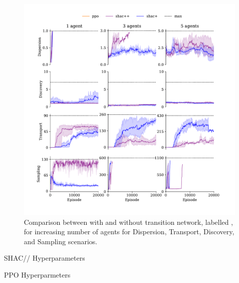 \begin{figure}[!t]
    \centering
    \includegraphics[width=\columnwidth]{figs/ablation-mlp.pdf}
    \caption{Comparison between \fname{} with and without transition network, labelled \fnamer{}, for increasing number of agents for Dispersion, Transport, Discovery, and Sampling scenarios.}
    \label{fig:ablation}
\end{figure}

\begin{table}[t]
        \centering
        
        \caption{SHAC/\fname{}/\fnamer{} Hyperparameters}
        \label{apx:tab:shac}
\end{table}

\begin{table}[t]
        \centering
        
        \caption{PPO Hyperparmeters}
        \label{apx:tab:ppo}
\end{table}

